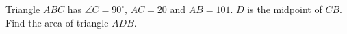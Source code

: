 Triangle $ABC$ has $\angle C=90^\circ$, $AC=20$ and $AB=101$. $D$ is the midpoint of $CB$. Find the area of triangle $ADB$.

